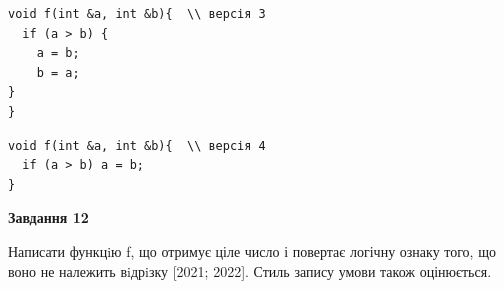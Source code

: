 \documentclass[12pt, ukrainian]{article}
\begin{document}
{\begin {large}
\begin{minipage}[t]{11.0cm}
\vspace{-8mm}\begin{verbatim}
void f(int &a, int &b){  \\ версія 3
  if (a > b) {
    a = b;
    b = a;
}  
}
\end{verbatim}

\vspace{-8mm}\begin{verbatim}
void f(int &a, int &b){  \\ версія 4
  if (a > b) a = b;
}
\end{verbatim}



\begin{center}
\textbf{Завдання 12}
\end{center}

Написати функцiю f, що отримує ціле число і повертає логічну ознаку того, що воно не належить вiдрiзку [2021; 2022]. Стиль запису умови також оцінюється.\par

\end{minipage}

\end {large}}
\newpage
\end{document}
